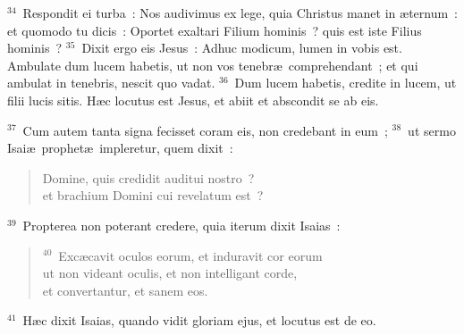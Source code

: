 ${}^{34}$~Respondit ei turba~: Nos audivimus ex lege, quia Christus manet in \ae ternum~: et quomodo tu dicis~: Oportet exaltari Filium hominis~? quis est iste Filius hominis~?
${}^{35}$~Dixit ergo eis Jesus~: Adhuc modicum, lumen in vobis est. Ambulate dum lucem habetis, ut non vos tenebr\ae\ comprehendant~; et qui ambulat in tenebris, nescit quo vadat.
${}^{36}$~Dum lucem habetis, credite in lucem, ut filii lucis sitis. H\ae c locutus est Jesus, et abiit et abscondit se ab eis.


${}^{37}$~Cum autem tanta signa fecisset coram eis, non credebant in eum~;
${}^{38}$~ut sermo Isai\ae\ prophet\ae\ impleretur, quem dixit~: \begin{flushleft}\begin{verse}Domine, quis credidit auditui nostro~?\\ et brachium Domini cui revelatum est~?\end{verse}\end{flushleft}


${}^{39}$~Propterea non poterant credere, quia iterum dixit Isaias~:
\begin{flushleft}\begin{verse}${}^{40}$~Exc\ae cavit oculos eorum, et induravit cor eorum\\ ut non videant oculis, et non intelligant corde,\\ et convertantur, et sanem eos.\end{verse}\end{flushleft}


${}^{41}$~H\ae c dixit Isaias, quando vidit gloriam ejus, et locutus est de eo.


